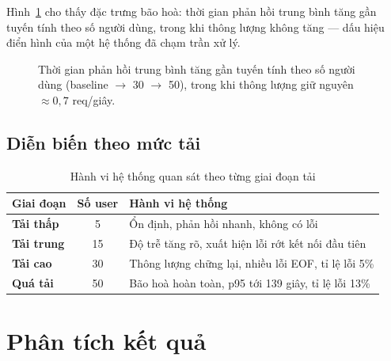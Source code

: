 \documentclass[12pt,a4paper]{article}
\begin{document}
Hình~\ref{fig:scaling} cho thấy đặc trưng bão hoà: thời gian phản hồi trung bình
tăng gần tuyến tính theo số người dùng, trong khi thông lượng không tăng --- dấu
hiệu điển hình của một hệ thống đã chạm trần xử lý.

\begin{figure}[H]
\centering
{}
\caption{Thời gian phản hồi trung bình tăng gần tuyến tính theo số người dùng
(baseline $\to$ 30 $\to$ 50), trong khi thông lượng giữ nguyên $\approx 0{,}7$ req/giây.}
\label{fig:scaling}
\end{figure}

\subsection{Diễn biến theo mức tải}

\begin{table}[H]
\centering
\caption{Hành vi hệ thống quan sát theo từng giai đoạn tải}
\begin{tabularx}{\textwidth}{>{\bfseries}p{2.6cm}cX}
\toprule
Giai đoạn & Số user & Hành vi hệ thống\\
\midrule
Tải thấp   & 5  & Ổn định, phản hồi nhanh, không có lỗi\\
Tải trung  & 15 & Độ trễ tăng rõ, xuất hiện lỗi rớt kết nối đầu tiên\\
Tải cao    & 30 & Thông lượng chững lại, nhiều lỗi EOF, tỉ lệ lỗi 5\%\\
Quá tải    & 50 & Bão hoà hoàn toàn, p95 tới 139 giây, tỉ lệ lỗi 13\%\\
\bottomrule
\end{tabularx}
\end{table}

\section{Phân tích kết quả}
\end{document}
